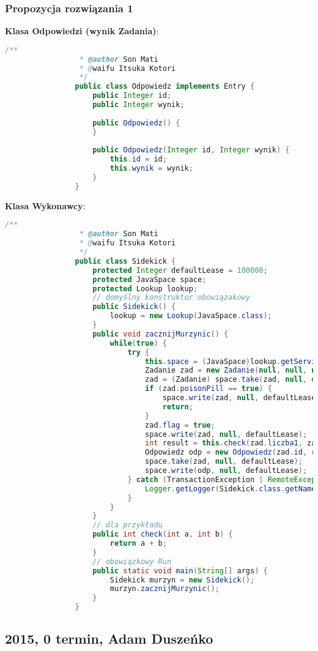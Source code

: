 		\subsubsection{Propozycja rozwiązania 1}
			\textbf{Klasa Odpowiedzi (wynik Zadania)}:
			\begin{lstlisting}[language=Java]
				/**
				 * @author Son Mati
				 * @waifu Itsuka Kotori
				 */
				public class Odpowiedz implements Entry {
					public Integer id;
					public Integer wynik;
					
					public Odpowiedz() {
					}
					
					public Odpowiedz(Integer id, Integer wynik) {
						this.id = id;
						this.wynik = wynik;
					}
				}
			\end{lstlisting}
			\newpage
			\textbf{Klasa Wykonawcy}:
			\begin{lstlisting}[language=Java]
				/**
				 * @author Son Mati
				 * @waifu Itsuka Kotori
				 */
				public class Sidekick {
					protected Integer defaultLease = 100000;
					protected JavaSpace space;
					protected Lookup lookup;
					// domyślny konstruktor obowiązakowy
					public Sidekick() {
						lookup = new Lookup(JavaSpace.class);
					}
					public void zacznijMurzynic() {
						while(true) {
							try {
								this.space = (JavaSpace)lookup.getService();
								Zadanie zad = new Zadanie(null, null, null, false, null);
								zad = (Zadanie) space.take(zad, null, defaultLease);
								if (zad.poisonPill == true) {
									space.write(zad, null, defaultLease);
									return;
								}
								zad.flag = true;
								space.write(zad, null, defaultLease);
								int result = this.check(zad.liczba1, zad.liczba2);
								Odpowiedz odp = new Odpowiedz(zad.id, result);
								space.take(zad, null, defaultLease);    // pełen wzorzec
								space.write(odp, null, defaultLease);
							} catch (TransactionException | RemoteException | UnusableEntryException | InterruptedException ex) {
								Logger.getLogger(Sidekick.class.getName()).log(Level.SEVERE, null, ex);
							}
						}
					}
					// dla przykładu
					public int check(int a, int b) {
						return a + b;
					}
					// obowiązkowy Run
					public static void main(String[] args) {
						Sidekick murzyn = new Sidekick();
						murzyn.zacznijMurzynic();
					}
				}
			\end{lstlisting}
	\newpage
	\subsection{2015, 0 termin, Adam Duszeńko}
